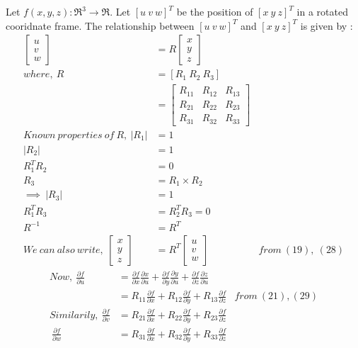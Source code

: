 \documentclass[a4paper,fleqn,11pt]{article}
\theoremstyle{mytheor}
\begin{document}
Let $f(x, y, z) : \Re^3 \rightarrow \Re$. Let $[u\ v\ w]^T$ be the position of $[x\ y\ z]^T$ in a rotated cooridnate frame.
The relationship between $[u\ v\ w]^T$ and $[x\ y\ z]^T$ is given by :
\begin{align}
\begin{bmatrix}
	u \\
	v \\
	w
\end{bmatrix} & =
	R
\begin{bmatrix}
	x \\
	y \\
	z
\end{bmatrix} \\
where,\ R & = [R_1\ R_2\ R_3] \\
& = \begin{bmatrix}
		R_{11} & R_{12} & R_{13} \\
		R_{21} & R_{22} & R_{23} \\
		R_{31} & R_{32} & R_{33}
	\end{bmatrix} \\
Known\ properties\ of\ R,\ |R_1| & = 1 \\
|R_2| & = 1 \\
R_1^T R_2 & = 0 \\
R_3  & = R_1 \times R_2 \\
\implies\ |R_3| & = 1 \\
R_1^T R_3 & = R_2^T R_3 = 0 \\
R^{-1} & = R^T \\
We\ can\ also\ write,\
\begin{bmatrix}
	x \\
	y \\
	z
\end{bmatrix} & =
	R^T
\begin{bmatrix}
	u \\
	v \\
	w
\end{bmatrix} & from\ (19),\ (28)
\end{align}
\begin{align}
Now,\ \frac{\partial f}{\partial u} & =
\frac{\partial f}{\partial x}\frac{\partial x}{\partial u} +
\frac{\partial f}{\partial y}\frac{\partial y}{\partial u} +
\frac{\partial f}{\partial z}\frac{\partial z}{\partial u} \\
& = R_{11}\frac{\partial f}{\partial x} +
	R_{12}\frac{\partial f}{\partial y} +
	R_{13}\frac{\partial f}{\partial z} & from\ (21), (29) \\
Similarily,\ \frac{\partial f}{\partial v}
& = R_{21}\frac{\partial f}{\partial x} +
	R_{22}\frac{\partial f}{\partial y} +
	R_{23}\frac{\partial f}{\partial z}\\
\ \frac{\partial f}{\partial w}
& = R_{31}\frac{\partial f}{\partial x} +
	R_{32}\frac{\partial f}{\partial y} +
	R_{33}\frac{\partial f}{\partial z}
\end{align}
\end{document}
